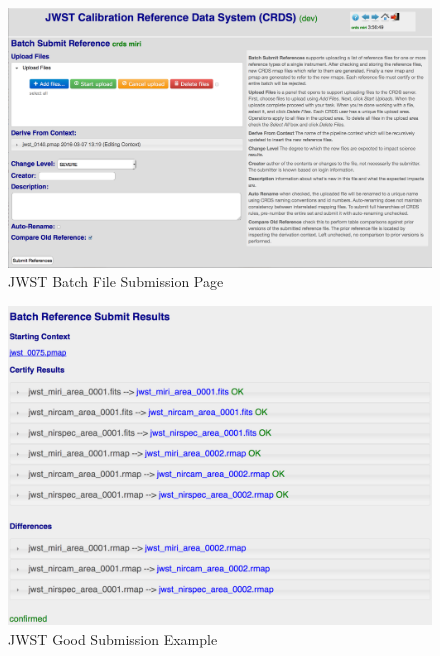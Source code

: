 \documentclass[final,authoryear,5p,times,twocolumn]{elsarticle}
\begin{document}
\begin{figure}[ht!]
\centering
\includegraphics[width=180mm]{JWST_Batch_File_Submission.png}
\caption{JWST Batch File Submission Page}
\label{fig:batchsubmission}
\end{figure}

\begin{figure}[ht!]
\centering
\includegraphics[width=180mm]{JWST_Good_Submission_Review_Page_(after_confirmation).png}
\caption{JWST Good Submission Example}
\label{fig:goodsubmissionreview}
\end{figure}
\end{document}
